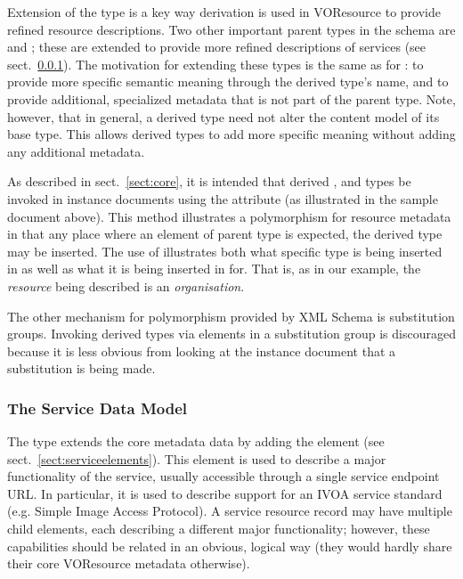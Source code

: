 \documentclass[11pt,a4paper]{ivoa}
\begin{document}
Extension of the  type is a key way
derivation is used in VOResource to provide refined resource
descriptions.  Two other important parent types in the schema are
 and ; these are
extended to provide more refined descriptions of services (see
sect.~\ref{sect:servicemodel}).  The motivation for extending
these types is the same as for : to provide
more specific semantic meaning through the derived type's name, and to
provide additional, specialized metadata that is not part of the
parent type.  Note, however, that in general, a derived type need not
alter the content model of its base type.  This allows derived types
to add more specific meaning without adding any additional metadata.



As described in sect.~\ref{sect:core}, it is intended that derived
,  and 
types be invoked in instance documents using the 
attribute (as illustrated in the sample document above).  This method
illustrates a polymorphism for resource metadata in that any place where
an element of parent type is expected, the derived type may be inserted.
The use of  illustrates both what specific type is being
inserted in as well as what it is being inserted in for.  That is, as in
our example, the \emph{resource} being described is an
\emph{organisation}.  



The other mechanism for polymorphism provided by XML Schema is
substitution groups.  Invoking derived  types via
elements in a substitution group is discouraged because it is less
obvious from looking at the instance document that a substitution is
being made.  


\subsubsection{The Service Data Model}
\label{sect:servicemodel}


The  type extends the core 
metadata data by adding the  element (see
sect.~\ref{sect:serviceelements}).  This element is used to describe a major
functionality of the service, usually accessible through a single
service endpoint URL.  In particular, it is used to describe support for
an IVOA service standard (e.g. Simple Image Access Protocol).  A service
resource record may have multiple child  elements,
each describing a different major functionality; however, these
capabilities should be related in an obvious, logical way (they would
hardly share their core VOResource metadata otherwise).
\end{document}
